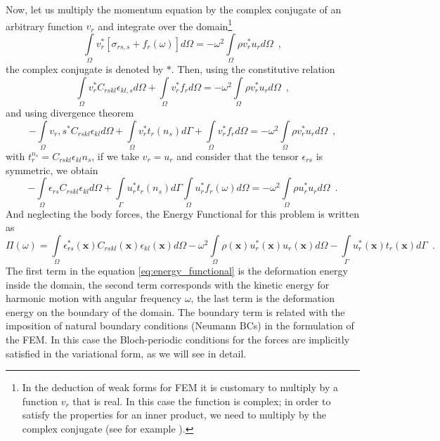 Now, let us multiply the momentum equation by the complex conjugate of an arbitrary function $v_r$ and integrate over the domain\footnote{In the deduction of weak forms for FEM it is customary to multiply by a function $v_r$ that is real. In this case the function is complex; in order to satisfy the properties for an inner product, we need to multiply by the complex conjugate (see for example  \cite{sukumar_bloch-2009, book:arfken}).}
\[\int\limits_{\Omega} v_r^{*}[\sigma_{rs,s} + f_r(\omega)]d \Omega = -\omega^2 \int\limits_{\Omega} \rho v_r^{*} u_r d \Omega \enspace , \]
the complex conjugate is denoted by $*$. Then, using the constitutive relation
\[\int\limits_{\Omega} v_r^{*}C_{rskl}\epsilon_{kl,s}d \Omega + \int\limits_{\Omega} v_r^{*}f_r d \Omega = -\omega^2 \int\limits_{\Omega} \rho v_r^{*} u_r d \Omega \enspace , \]
and using divergence theorem
\[-\int\limits_{\Omega} v_r,s^{*}C_{rskl}\epsilon_{kl}d \Omega + \int\limits_{\Omega}v_r^{*}t_r(n_s)d \Gamma +  \int\limits_{\Omega} v_r^{*}f_r d \Omega = -\omega^2 \int\limits_{\Omega} \rho v_r^{*} u_r d \Omega \enspace , \]
with $t_r^{n_s} = C_{rskl}\epsilon_{kl}n_{s}$, if we take $v_r = u_r$ and consider that the tensor $\epsilon_{rs}$ is symmetric, we obtain
\[ -\int\limits_{\Omega} \epsilon_{rs}C_{rskl}\epsilon_{kl} d \Omega + \int\limits_\Gamma u_r^{*} t_{r}(n_s) d \Gamma \int\limits_\Omega u_r^{*}f_r(\omega) d\Omega = -\omega^2\int\limits_\Omega \rho u_r^{*} u_r d\Omega \enspace . \]
And neglecting the body forces, the Energy Functional for this problem is written as
\begin{equation}
\Pi(\omega) = \int\limits_\Omega \epsilon_{rs}^{*}(\mathbf{x})C_{rskl}(\mathbf{x})\epsilon_{kl}(\mathbf{x}) d \Omega - \omega^2\int\limits_\Omega \rho(\mathbf{x})u_r^{*}(\mathbf{x})u_r(\mathbf{x}) d\Omega - \int\limits_{\Gamma} u_r^{*}(\mathbf{x})t_r(\mathbf{x}) d\Gamma \enspace .
\label{eq:energy_functional}
\end{equation}
The first term in the equation \eqref{eq:energy_functional} is the deformation energy inside the domain, the second term corresponds with the kinetic energy for harmonic motion with angular frequency $\omega$, the last term is the deformation energy on the boundary of the domain. The boundary term is related with the imposition of natural boundary conditions (Neumann BCs) in the formulation of the FEM. In this case the Bloch-periodic conditions for the forces are implicitly satisfied  in the variational form, as we will see in detail.

